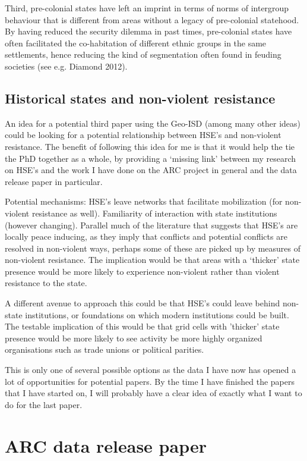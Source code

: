 \documentclass[12pt]{article}
\begin{document}
Third, pre-colonial states have left an imprint in terms of norms of intergroup
behaviour that is different from areas without a legacy of pre-colonial
statehood. By having reduced the security dilemma in past times, pre-colonial
states have often facilitated the co-habitation of different ethnic groups in
the same settlements, hence reducing the kind of segmentation often found in
feuding societies (see e.g. Diamond 2012).

\subsection{Historical states and non-violent resistance}

An idea for a potential third paper using the Geo-ISD (among many other ideas)
could be looking for a potential relationship between HSE's and non-violent
resistance. The benefit of following this idea for me is that it would help the
tie the PhD together as a whole, by providing a `missing link' between my
research on HSE's and the work I have done on the ARC project in general and the
data release paper in particular.

Potential mechanisms: HSE's leave networks that facilitate mobilization (for
non-violent resistance as well). Familiarity of interaction with state
institutions (however changing). Parallel much of the literature that suggests
that HSE's are locally peace inducing, as they imply that conflicts and
potential conflicts are resolved in non-violent ways, perhaps some of these are
picked up by measures of non-violent resistance. The implication would be that
areas with a `thicker' state presence would be more likely to experience
non-violent rather than violent resistance to the state.

A different avenue to approach this could be that HSE's could leave behind
non-state institutions, or foundations on which modern institutions could be
built. The testable implication of this would be that grid cells with 'thicker'
state presence would be more likely to see activity be more highly organized
organisations such as trade unions or political parities.

This is only one of several possible options as the data I have now has opened a
lot of opportunities for potential papers. By the time I have finished the
papers that I have started on, I will probably have a clear idea of exactly what
I want to do for the last paper.

\section{ARC data release paper}
\end{document}

